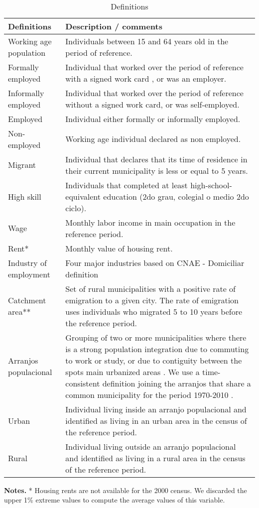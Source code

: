 

\begin{sidewaystable}[htbp]
  \caption{Definitions}\\


    \begin{tabular}{lp{47.5em}}
    \textbf{Definitions} & \multicolumn{1}{l}{\textbf{Description / comments}} \\
    \midrule
    Working age population & Individuals between 15 and 64 years old in the period of reference. \\
    Formally employed & Individual that worked over the period of reference with a signed work card , or was an employer. \\
    Informally employed & Individual that worked over the period of reference without a signed work card, or was self-employed.  \\
    Employed & Individual either formally or informally employed. \\
    Non-employed & Working age individual declared as non employed. \\
    Migrant & Individual that declares that its time of residence in their current municipality is less or equal to 5 years.  \\
    High skill & Individuals that completed at least high-school-equivalent education (2do grau, colegial o medio 2do ciclo). \\
    Wage  & Monthly labor income in main occupation in the reference period. \\
    Rent* & Monthly value of housing rent. \\
    Industry of employment & Four major industries based on CNAE - Domiciliar definition \\
    Catchment area** & Set of rural municipalities with a positive rate of emigration to a given city. The rate of  emigration uses individuals who migrated 5 to 10 years before the reference period. \\
    Arranjos populacional & Grouping of two or more municipalities where there is a strong population integration due to commuting to work or study, or due to contiguity between the spots main urbanized areas \citet{IBGE2016}. We use a time-consistent definition joining the arranjos that share a common municipality for the period 1970-2010 . \\
    Urban  & Individual living inside an arranjo populacional and identified as living in an urban area in the census of the reference period. \\
    Rural & Individual living outside an arranjo populacional and identified as living in a rural area in the census of the reference period. \\
    \bottomrule
    \end{tabular}%
  \label{tab:addlabel}%
	 \begin{tablenotes}
			\footnotesize \textbf{Notes.} * Housing rents are not available for the 2000 census. We discarded the upper 1\%  extreme values to compute the average values of this variable.


\end{tablenotes}
\end{sidewaystable}
